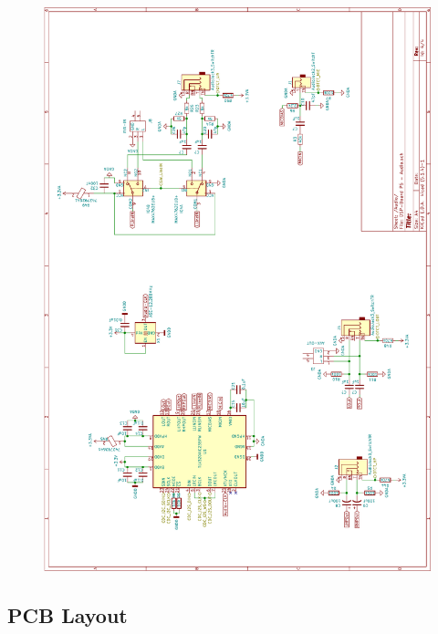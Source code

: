 \begin{appendix}
\begin{figure}[h]
	\centering
	\includegraphics[width=0.95\linewidth]{appendix/DSP-Board-Schema-V1-1(4).pdf}
\end{figure}

\clearpage

\subsection{PCB Layout}
\label{app:PCB}


\end{appendix}
